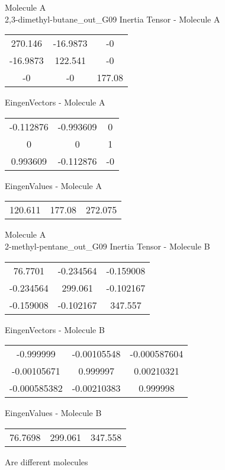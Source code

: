 \newpage
\begin{multicols}{2}
\begin{center}
Molecule A \\ 
2,3-dimethyl-butane_out_G09
Inertia Tensor - Molecule A \\
\vtab
\begin{tabular}{|c c c|}
270.146	 & 	-16.9873	 & 	-0	 \\
-16.9873	 & 	122.541	 & 	-0	 \\
-0	 & 	-0	 & 	177.08
\end{tabular}

\vtab
 EingenVectors - Molecule A     \\
\vtab
\begin{tabular}{|c c c|}
-0.112876	 & 	-0.993609	 & 	0	 \\
0	 & 	0	 & 	1	 \\
0.993609	 & 	-0.112876	 & 	-0
\end{tabular}

\vtab
 EingenValues - Molecule A     \\
\vtab
\begin{tabular}{|c c c|}
120.611	 & 	177.08	 & 	272.075
\end{tabular}
\columnbreak
Molecule A \\ 
2-methyl-pentane_out_G09
Inertia Tensor - Molecule B \\
\vtab
\begin{tabular}{|c c c|}
76.7701	 & 	-0.234564	 & 	-0.159008	 \\
-0.234564	 & 	299.061	 & 	-0.102167	 \\
-0.159008	 & 	-0.102167	 & 	347.557
\end{tabular}

\vtab
 EingenVectors - Molecule B     \\
\vtab
\begin{tabular}{|c c c|}
-0.999999	 & 	-0.00105548	 & 	-0.000587604	 \\
-0.00105671	 & 	0.999997	 & 	0.00210321	 \\
-0.000585382	 & 	-0.00210383	 & 	0.999998
\end{tabular}

\vtab
 EingenValues - Molecule B     \\
\vtab
\begin{tabular}{|c c c|}
76.7698	 & 	299.061	 & 	347.558
\end{tabular}
\textcolor{NavyBlue}{\large Are different molecules}
\end{center}
\end{multicols}
